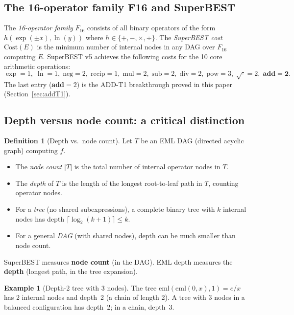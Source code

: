 \documentclass[12pt,a4paper]{article}
\theoremstyle{definition}
\newtheorem{definition}[theorem]{Definition}
\newtheorem{example}[theorem]{Example}
\theoremstyle{remark}
\begin{document}
\subsection{The 16-operator family F16 and SuperBEST}

The \emph{16-operator family} $F_{16}$ consists of all binary operators of the form
$h(\exp(\pm x), \ln(y))$ where $h \in \{+, -, \times, \div\}$.
The \emph{SuperBEST cost} $\mathrm{Cost}(E)$ is the minimum number of internal nodes
in any DAG over $F_{16}$ computing $E$.
SuperBEST v5 achieves the following costs for the 10 core arithmetic operations:
\[
  \exp=1,\; \ln=1,\; \mathrm{neg}=2,\; \mathrm{recip}=1,\;
  \mathrm{mul}=2,\; \mathrm{sub}=2,\; \mathrm{div}=2,\;
  \mathrm{pow}=3,\; \sqrt{\cdot}=2,\; \mathbf{add=2}.
\]
The last entry (\textbf{add}$=2$) is the ADD-T1 breakthrough proved in this paper
(Section~\ref{sec:addT1}).

\subsection{Depth versus node count: a critical distinction}
\label{ssec:depth-vs-count}

\begin{definition}[Depth vs.\ node count]\label{def:depth-vs-count}
Let $T$ be an EML DAG (directed acyclic graph) computing $f$.
\begin{itemize}
  \item The \emph{node count} $|T|$ is the total number of internal operator nodes in $T$.
  \item The \emph{depth} of $T$ is the length of the longest root-to-leaf path in $T$,
        counting operator nodes.
  \item For a \emph{tree} (no shared subexpressions), a complete binary tree with $k$ internal
        nodes has depth $\lceil \log_2(k+1) \rceil \leq k$.
  \item For a general \emph{DAG} (with shared nodes), depth can be much smaller than node count.
\end{itemize}
SuperBEST measures \textbf{node count} (in the DAG).
EML depth measures the \textbf{depth} (longest path, in the tree expansion).
\end{definition}

\begin{example}[Depth-2 tree with 3 nodes]
The tree $\mathrm{eml}(\mathrm{eml}(0,x), 1) = e/x$ has 2 internal nodes and depth~2
(a chain of length 2).  A tree with 3 nodes in a balanced configuration has depth~2;
in a chain, depth~3.
\end{example}
\end{document}
